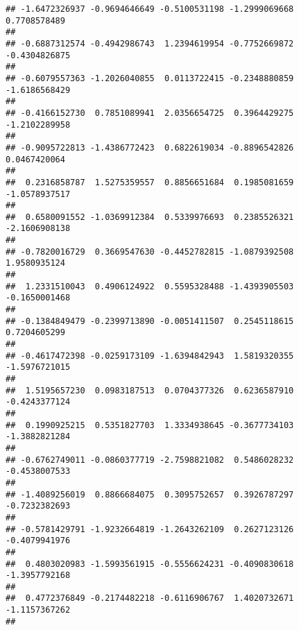 \documentclass[]{article}
\begin{document}
\begin{verbatim}
## -1.6472326937 -0.9694646649 -0.5100531198 -1.2999069668  0.7708578489 
##                                                                       
## -0.6887312574 -0.4942986743  1.2394619954 -0.7752669872 -0.4304826875 
##                                                                       
## -0.6079557363 -1.2026040855  0.0113722415 -0.2348880859 -1.6186568429 
##                                                                       
## -0.4166152730  0.7851089941  2.0356654725  0.3964429275 -1.2102289958 
##                                                                       
## -0.9095722813 -1.4386772423  0.6822619034 -0.8896542826  0.0467420064 
##                                                                       
##  0.2316858787  1.5275359557  0.8856651684  0.1985081659 -1.0578937517 
##                                                                       
##  0.6580091552 -1.0369912384  0.5339976693  0.2385526321 -2.1606908138 
##                                                                       
## -0.7820016729  0.3669547630 -0.4452782815 -1.0879392508  1.9580935124 
##                                                                       
##  1.2331510043  0.4906124922  0.5595328488 -1.4393905503 -0.1650001468 
##                                                                       
## -0.1384849479 -0.2399713890 -0.0051411507  0.2545118615  0.7204605299 
##                                                                       
## -0.4617472398 -0.0259173109 -1.6394842943  1.5819320355 -1.5976721015 
##                                                                       
##  1.5195657230  0.0983187513  0.0704377326  0.6236587910 -0.4243377124 
##                                                                       
##  0.1990925215  0.5351827703  1.3334938645 -0.3677734103 -1.3882821284 
##                                                                       
## -0.6762749011 -0.0860377719 -2.7598821082  0.5486028232 -0.4538007533 
##                                                                       
## -1.4089256019  0.8866684075  0.3095752657  0.3926787297 -0.7232382693 
##                                                                       
## -0.5781429791 -1.9232664819 -1.2643262109  0.2627123126 -0.4079941976 
##                                                                       
##  0.4803020983 -1.5993561915 -0.5556624231 -0.4090830618 -1.3957792168 
##                                                                       
##  0.4772376849 -0.2174482218 -0.6116906767  1.4020732671 -1.1157367262 
##                                                                       

\end{verbatim}
\end{document}
